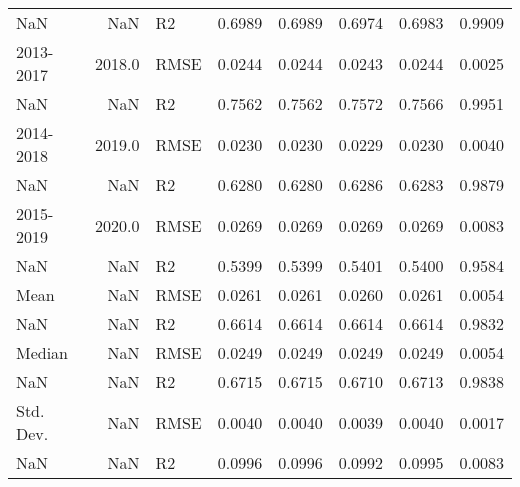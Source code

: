 \begin{tabular}{lrlrrrrr}
       NaN &     NaN &      R2 &  0.6989 &  0.6989 &  0.6974 &       0.6983 &  0.9909 \\
 2013-2017 &  2018.0 &    RMSE &  0.0244 &  0.0244 &  0.0243 &       0.0244 &  0.0025 \\
       NaN &     NaN &      R2 &  0.7562 &  0.7562 &  0.7572 &       0.7566 &  0.9951 \\
 2014-2018 &  2019.0 &    RMSE &  0.0230 &  0.0230 &  0.0229 &       0.0230 &  0.0040 \\
       NaN &     NaN &      R2 &  0.6280 &  0.6280 &  0.6286 &       0.6283 &  0.9879 \\
 2015-2019 &  2020.0 &    RMSE &  0.0269 &  0.0269 &  0.0269 &       0.0269 &  0.0083 \\
       NaN &     NaN &      R2 &  0.5399 &  0.5399 &  0.5401 &       0.5400 &  0.9584 \\
      Mean &     NaN &    RMSE &  0.0261 &  0.0261 &  0.0260 &       0.0261 &  0.0054 \\
       NaN &     NaN &      R2 &  0.6614 &  0.6614 &  0.6614 &       0.6614 &  0.9832 \\
    Median &     NaN &    RMSE &  0.0249 &  0.0249 &  0.0249 &       0.0249 &  0.0054 \\
       NaN &     NaN &      R2 &  0.6715 &  0.6715 &  0.6710 &       0.6713 &  0.9838 \\
 Std. Dev. &     NaN &    RMSE &  0.0040 &  0.0040 &  0.0039 &       0.0040 &  0.0017 \\
       NaN &     NaN &      R2 &  0.0996 &  0.0996 &  0.0992 &       0.0995 &  0.0083 \\
\bottomrule
\end{tabular}
